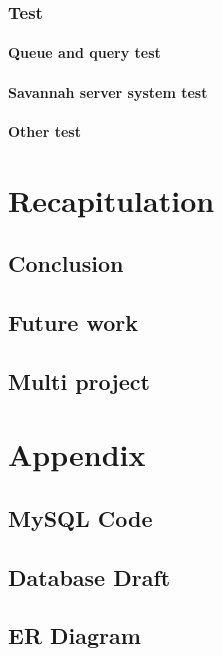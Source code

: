     \subsection{Test}
	
        \subsubsection{Queue and query test}
	
	\subsubsection{Savannah server system test}
	
	\subsubsection{Other test}

\chapter{Recapitulation}
  \section{Conclusion}
  \section{Future work}
  \section{Multi project} %

\appendix
	\chapter{Appendix}
	\section{MySQL Code}
	\label{MySQLcode}
		
	\section{Database Draft}
		\label{sec:Databasedrafts}
		
	\section{ER Diagram}
	\label{errDiagram}
		
